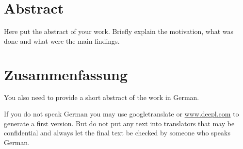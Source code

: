 \newpage
\section*{Abstract}
Here put the abstract of your work.
Briefly explain the motivation, what was done and what were the main findings.

\newpage
\section*{Zusammenfassung}
You also need to provide a short abstract of the work in German.

If you do not speak German you may use googletranslate or \url{www.deepl.com} to generate a first version. But do not put any text into translators that may be confidential and always let the final text be checked by someone who speaks German.
\newpage

